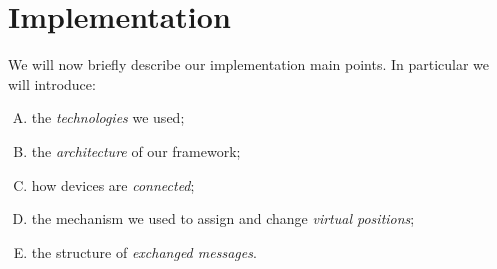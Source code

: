\section{Implementation}

We will now briefly describe our implementation main points. In particular we will introduce:
	\begin{enumerate}[A.]
		\item the \textit{technologies} we used;
		\item the \textit{architecture} of our framework;
		\item how devices are \textit{connected};
		\item the mechanism we used to assign and change \textit{virtual positions};
		\item the structure of \textit{exchanged messages}.
	\end{enumerate}





